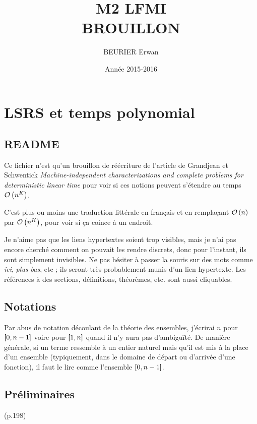 \documentclass{report}
\author{BEURIER Erwan}
\title{M2 LFMI \\ BROUILLON }
\date{Année 2015-2016}
\begin{document}
	
	\maketitle
	
	\tableofcontents
	
	\pagebreak 
	
	\chapter{LSRS et temps polynomial}
	\label{chap:LSRS}
	
	\section*{README}
		\label{sec:README}
	
	Ce fichier n'est qu'un brouillon de réécriture de l'article de Grandjean et Schwentick \emph{Machine-independent characterizations and complete problems for deterministic linear time} pour voir si ces notions peuvent s'étendre au temps $\mathcal{O}\left( n^K \right)$.
	
	C'est plus ou moins une traduction littérale en français et en remplaçant $\mathcal{O}\left( n \right)$ par $\mathcal{O}\left( n^K \right)$, pour voir si ça coince à un endroit.
	
	Je n'aime pas que les liens hypertextes soient trop visibles, mais je n'ai pas encore cherché comment on pouvait les rendre discrets, donc pour l'instant, ils sont simplement invisibles. Ne pas hésiter à passer la souris sur des mots comme \emph{ici}, \emph{plus bas}, etc ; ils seront très probablement munis d'un lien hypertexte. Les références à des sections, définitions, théorèmes, etc. sont aussi cliquables.
	
	
	\section*{Notations}
		\label{sec:Notations}
	
	
	Par abus de notation découlant de la théorie des ensembles, j'écrirai $n$ pour $\left[\!\!\>\!\left[ 0 , n-1 \right]\!\!\>\!\right]$ voire pour $\left[\!\!\>\!\left[ 1 , n \right]\!\!\>\!\right]$ quand il n'y aura pas d'ambiguïté. De manière générale, si un terme ressemble à un entier naturel mais qu'il est mis à la place d'un ensemble (typiquement, dans le domaine de départ ou d'arrivée d'une fonction), il faut le lire comme l'ensemble $\left[\!\!\>\!\left[ 0 , n-1 \right]\!\!\>\!\right]$.
	
	\pagebreak
	
	\section{Préliminaires} (p.198)
		\label{sec:Preliminaries}
	
\end{document}
